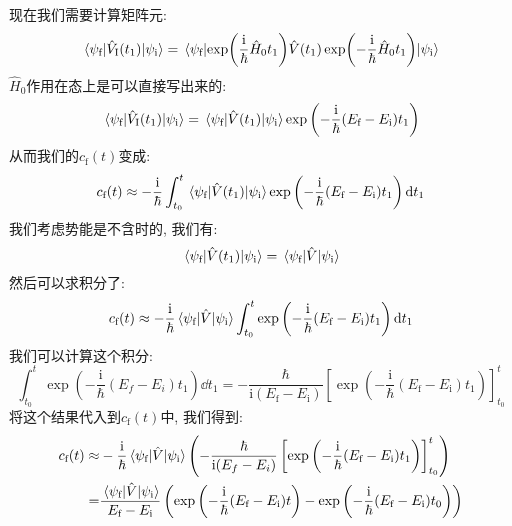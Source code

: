 现在我们需要计算矩阵元:
\begin{equation}
  \mel{\psi_{\text{f}}}{\hat{V}_{\text{I}}(t_1)}{\psi_{\text{i}}} = \mel{\psi_{\text{f}}}{\exp(\frac{\mathrm{i}}{\hbar} \hat{H}_0 t_1) \hat{V}(t_1) \exp(-\frac{\mathrm{i}}{\hbar} \hat{H}_0 t_1)}{\psi_{\text{i}}}
\end{equation}
$\hat{H}_0$作用在态上是可以直接写出来的:
\begin{equation}
  \mel{\psi_{\text{f}}}{\hat{V}_{\text{I}}(t_1)}{\psi_{\text{i}}} = \mel{\psi_{\text{f}}}{\hat{V}(t_1)}{\psi_{\text{i}}} \exp\left( -\frac{\mathrm{i}}{\hbar} (E_{\text{f}} - E_{\text{i}}) t_1 \right)
\end{equation}
从而我们的$c_{\text{f}}(t)$变成:
\begin{equation}
  c_{\text{f}}(t) \approx - \frac{\mathrm{i}}{\hbar} \int_{t_0}^{t} \mel{\psi_{\text{f}}}{\hat{V}(t_1)}{\psi_{\text{i}}} \exp\left( -\frac{\mathrm{i}}{\hbar} (E_{\text{f}} - E_{\text{i}}) t_1 \right) \dd{t_1}
\end{equation}
我们考虑势能是不含时的, 我们有:
\begin{equation}
  \mel{\psi_{\text{f}}}{\hat{V}(t_1)}{\psi_{\text{i}}} = \mel{\psi_{\text{f}}}{\hat{V}}{\psi_{\text{i}}}
\end{equation}
然后可以求积分了:
\begin{equation}
  c_{\text{f}}(t) \approx - \frac{\mathrm{i}}{\hbar} \mel{\psi_{\text{f}}}{\hat{V}}{\psi_{\text{i}}} \int_{t_0}^{t} \exp\left( -\frac{\mathrm{i}}{\hbar} (E_{\text{f}} - E_{\text{i}}) t_1 \right) \dd{t_1}
\end{equation}
我们可以计算这个积分:
\begin{equation}
  \int_{t_0}^{t} \exp\left( -\frac{\mathrm{i}}{\hbar} (E_f - E_i) t_1 \right) \dd{t_1} = -\frac{\hbar}{\mathrm{i}(E_{\text{f}} - E_{\text{i}})} \left[ \exp\left( -\frac{\mathrm{i}}{\hbar} (E_{\text{f}} - E_{\text{i}}) t_1 \right) \right]_{t_0}^{t}
\end{equation}
将这个结果代入到$c_{\text{f}}(t)$中, 我们得到:
\begin{align}
  c_{\text{f}}(t) \approx& - \frac{\mathrm{i}}{\hbar} \mel{\psi_{\text{f}}}{\hat{V}}{\psi_{\text{i}}} \left( -\frac{\hbar}{\mathrm{i}(E_f - E_i)} \left[ \exp\left( -\frac{\mathrm{i}}{\hbar} (E_{\text{f}} - E_{\text{i}}) t_1 \right) \right]_{t_0}^{t} \right) \\
  =& \frac{\mel{\psi_{\text{f}}}{\hat{V}}{\psi_{\text{i}}}}{E_{\text{f}} - E_{\text{i}}} \left( \exp\left( -\frac{\mathrm{i}}{\hbar} (E_{\text{f}} - E_{\text{i}}) t \right) - \exp\left( -\frac{\mathrm{i}}{\hbar} (E_{\text{f}} - E_{\text{i}}) t_0 \right) \right)
\end{align}
